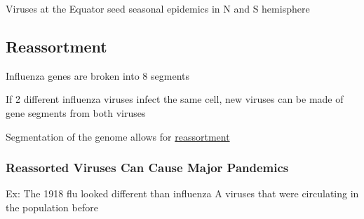 \documentclass{notes}
\begin{document}
\tab \indicates Viruses at the Equator seed seasonal epidemics in N and S hemisphere

\subsection{Reassortment}

Influenza genes are broken into 8 segments

If 2 different influenza viruses infect the same cell, new viruses can be made of gene segments from both viruses

\tab \indicates Segmentation of the genome allows for \underline{reassortment}

\subsubsection{Reassorted Viruses Can Cause Major Pandemics}

\tab Ex: The 1918 flu looked different than influenza A viruses that were circulating in the population before

\end{document}

